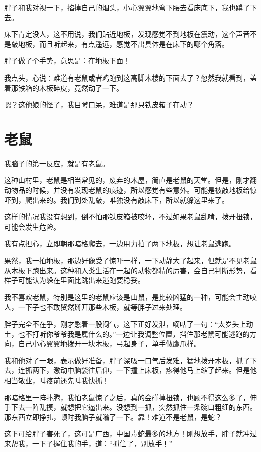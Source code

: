 胖子和我对视一下，掐掉自己的烟头，小心翼翼地弯下腰去看床底下，我也蹲了下去。

床下肯定没人，这不用说，我们贴近地板，发现感觉不到地板在震动，这个声音不是敲地板，而且听起来，有点遥远，感觉不出具体是在床下的哪个角落。

胖子做了个手势，意思是：在地板下面！

我点头，心说：难道有老鼠或者鸡跑到这高脚木楼的下面去了？忽然我就看到，盖着那铁箱的木板碎皮，竟然动了一下。

嗯？这他娘的怪了，我目瞪口呆，难道是那只铁皮箱子在动？

\chapter{老鼠}

我脑子的第一反应，就是有老鼠。

这种山村里，老鼠是相当常见的，废弃的木屋，简直是老鼠的天堂。但是，刚才翻动物品的时候，并没有发现老鼠的痕迹，所以感觉有些意外。可能是被敲地板给惊吓到，爬出来的。我们到处乱敲，唯独没有敲床下，所以就躲这里来了。

这样的情况我没有想到，倒不怕那铁皮箱被咬坏，不过如果老鼠乱啃，拨开扭锁，可能会发生危险。

我有点担心，立即朝那暗格爬去，一边用力拍了两下地板，想让老鼠逃跑。

果然，我一拍地板，那边好像受了惊吓一样，一下动静大了起来，但就是不见老鼠从木板下跑出来。这种和人类生活在一起的动物都精的厉害，会自己判断形势，看样子可能认为躲在里面比跳出来逃跑要稳妥。

我不喜欢老鼠，特别是这里的老鼠应该是山鼠，是比较凶猛的一种，可能会主动咬人，一下子也不敢贸然掰开那些木板，就等胖子过来处理。

胖子完全不在乎，刚才憋着一股闷气，这下正好发泄，嘀咕了一句：“太岁头上动土，也不打听你爷爷我是属什么的。”一边让我调整位置，挡住那老鼠可能逃跑的方向，自己小心翼翼地拨开一块木板，弓起身子，单手做鹰爪样。

我和他对了一眼，表示做好准备，胖子深吸一口气后发难，猛地拨开木板，抓了下去，连抓两下，激动中脑袋往后仰，一下撞上床板，疼得他马上缩了起来。但是他相当敬业，叫疼前还先叫我快抓！

那暗格里一阵扑腾，我怕老鼠惊了之后，真的会碰掉扭锁，也顾不得这么多了，伸手下去一阵乱摸，就想把它逼出来。没想到一抓，突然抓住一条碗口粗细的东西。那东西立即挣扎，顿时我脑子就嗡了一下。靠！难道不是老鼠，是蛇？

这下可给胖子害死了，这可是广西，中国毒蛇最多的地方！刚想放手，胖子就冲过来帮我，一下子握住我的手，道：“抓住了，别放手！”


